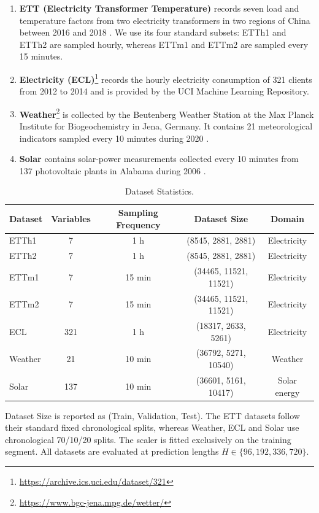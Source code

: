 \documentclass[final,3p,times]{elsarticle}
\begin{document}
\begin{enumerate}
\item \textbf{ETT (Electricity Transformer Temperature)} records seven load and temperature factors from two electricity transformers in two regions of China between 2016 and 2018 \citep{zhou2021informer}. We use its four standard subsets: ETTh1 and ETTh2 are sampled hourly, whereas ETTm1 and ETTm2 are sampled every 15 minutes.
\item \textbf{Electricity (ECL)}\footnote{\url{https://archive.ics.uci.edu/dataset/321}} records the hourly electricity consumption of 321 clients from 2012 to 2014 and is provided by the UCI Machine Learning Repository.
\item \textbf{Weather}\footnote{\url{https://www.bgc-jena.mpg.de/wetter/}} is collected by the Beutenberg Weather Station at the Max Planck Institute for Biogeochemistry in Jena, Germany. It contains 21 meteorological indicators sampled every 10 minutes during 2020 \citep{wu2023timesnet}.
\item \textbf{Solar} contains solar-power measurements collected every 10 minutes from 137 photovoltaic plants in Alabama during 2006 \citep{lai2018lstnet}.
\end{enumerate}

\begin{table}[t]
\centering
\scriptsize
\setlength{\tabcolsep}{4pt}
\caption{Dataset Statistics.}
\label{tab:dataset-statistics}
\begin{tabular}{lcccc}
\toprule
Dataset & Variables & Sampling Frequency & Dataset Size & Domain \\
\midrule
ETTh1 & 7 & 1 h & (8545, 2881, 2881) & Electricity \\
ETTh2 & 7 & 1 h & (8545, 2881, 2881) & Electricity \\
ETTm1 & 7 & 15 min & (34465, 11521, 11521) & Electricity \\
ETTm2 & 7 & 15 min & (34465, 11521, 11521) & Electricity \\
ECL & 321 & 1 h & (18317, 2633, 5261) & Electricity \\
Weather & 21 & 10 min & (36792, 5271, 10540) & Weather \\
Solar & 137 & 10 min & (36601, 5161, 10417) & Solar energy \\
\bottomrule
\end{tabular}
\end{table}


Dataset Size is reported as (Train, Validation, Test). The ETT datasets follow their standard fixed chronological splits, whereas Weather, ECL and Solar use chronological 70/10/20 splits. The scaler is fitted exclusively on the training segment. All datasets are evaluated at prediction lengths $H\in\{96,192,336,720\}$.
\end{document}
